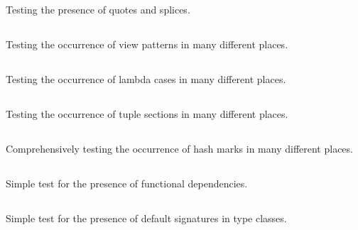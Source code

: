 \documentclass[main.tex]{subfiles}
\begin{document}
	\subsection{}
	
	Testing the presence of quotes and splices.
	
	\subsection{}
	
	Testing the occurrence of view patterns in many different places.
	
	\subsection{}
	
	Testing the occurrence of lambda cases in many different places.
	
	\subsection{}
	
	Testing the occurrence of tuple sections in many different places.
	
	\subsection{}
	
	Comprehensively testing the occurrence of hash marks in many different places.
	
	\subsection{}
	
	Simple test for the presence of functional dependencies.
	
	\subsection{}
	
	Simple test for the presence of default signatures in type classes.
	
	\subsection{}
	
\end{document}
